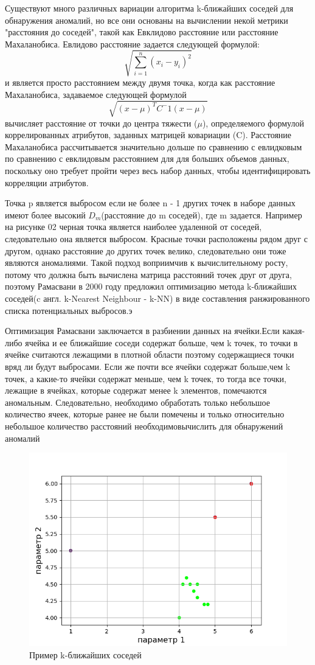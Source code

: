 Существуют много  различных вариации алгоритма k-ближайших соседей для обнаружения аномалий, но все они основаны на вычислении некой метрики "расстояния до соседей", такой как Евклидово расстояние или  расстояние Махаланобиса. Евлидово расстояние задается следующей формулой:
 	\begin{equation}
 	\sqrt{\sum_{i=1}^n(x_i-y_i)^2}
 		\end{equation}
 и является просто расстоянием между двумя точка, когда как  расстояние Махаланобиса, задаваемое следующей формулой
 	\begin{equation}
 	\sqrt{(x-\mu)^T C^-1 (x-\mu)}
 	\end{equation}
 	вычисляет расстояние от точки до центра тяжести ($\mu$), определяемого формулой коррелированных атрибутов, заданных матрицей ковариации (C). Расстояние  Махаланобиса
 	рассчитывается значительно дольше по сравнению с евлидковым
 	 по сравнению с евклидовым расстоянием для для больших объемов данных, поскольку оно требует
 	пройти через весь набор данных, чтобы идентифицировать корреляции атрибутов.
 	
 Точка p является выбросом
если не более n - 1 других точек в наборе данных имеют более высокий $D_m$(расстояние до m соседей), где m задается. Например на рисунке 02\cite{fig02} черная точка является наиболее удаленной от соседей, следовательно она является выбросом. Красные точки расположены рядом друг с другом, однако расстояние до других точек велико, следовательно они тоже являются аномалиями. Такой подход воприимчив к вычислительному росту, потому что должна быть вычислена матрица расстояний точек друг от друга, поэтому Рамасвани в 2000 году предложил оптимизацию метода k-ближайших соседей(c англ. k-Nearest Neighbour - k-NN)  в виде составления ранжированного списка потенциальных выбросов.э

 Оптимизация Рамасвани заключается в разбиении данных на ячейки.Если какая-либо ячейка и ее ближайшие соседи содержат больше, чем k
 точек, то точки в ячейке считаются лежащими в плотной области
 поэтому содержащиеся точки вряд ли будут выбросами. Если же почти все ячейки содержат больше,чем k точек, а какие-то ячейки содержат меньше, чем k точек, то тогда все точки, лежащие в ячейках, которые содержат  менее k элементов, помечаются  аномальным. Следовательно,
 необходимо обработать только небольшое количество ячеек, которые ранее не были помечены и только относительно небольшое количество расстояний необходимовычислить для обнаружений аномалий
\begin{figure}
	\centering
	\includegraphics[width=.5\textwidth]{img/2.png}
	\caption{Пример k-ближайших соседей}
	\label{fig02}
\end{figure}
 


